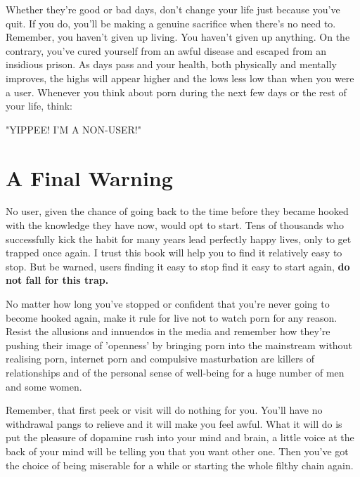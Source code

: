 \documentclass[easypeasy.tex]{subfiles}
\begin{document}
Whether they're good or bad days, don't change your life just because you've quit. If you do, you'll be making a genuine sacrifice when there's no need to. Remember, you haven't given up living. You haven't given up anything. On the contrary, you've cured yourself from an awful disease and escaped from an insidious prison. As days pass and your health, both physically and mentally improves, the highs will appear higher and the lows less low than when you were a user. Whenever you think about porn during the next few days or the rest of your life, think:

{\Large "YIPPEE! I'M A NON-USER!"}

\section{A Final Warning}

No user, given the chance of going back to the time before they became hooked with the knowledge they have now, would opt to start. Tens of thousands who successfully kick the habit for many years lead perfectly happy lives, only to get trapped once again. I trust this book will help you to find it relatively easy to stop. But be warned, users finding it easy to stop find it easy to start again, \textbf{do not fall for this trap.}

No matter how long you've stopped or confident that you're never going to become hooked again, make it rule for live not to watch porn for any reason. Resist the allusions and innuendos in the media and remember how they're pushing their image of 'openness' by bringing porn into the mainstream without realising porn, internet porn and compulsive masturbation are killers of relationships and of the personal sense of well-being for a huge number of men and some women.

Remember, that first peek or visit will do nothing for you. You'll have no withdrawal pangs to relieve and it will make you feel awful. What it will do is put the pleasure of dopamine rush into your mind and brain, a little voice at the back of your mind will be telling you that you want other one. Then you've got the choice of being miserable for a while or starting the whole filthy chain again.
\end{document}
